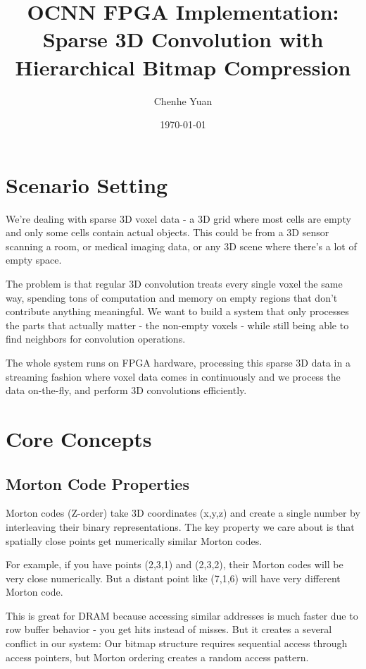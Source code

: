 \documentclass[12pt]{article}
\title{OCNN FPGA Implementation: Sparse 3D Convolution with Hierarchical Bitmap Compression}
\author{Chenhe Yuan}
\date{\today}
\begin{document}
\maketitle

\section{Scenario Setting}

We're dealing with sparse 3D voxel data - a 3D grid where most cells are empty and only some cells contain actual objects. This could be from a 3D sensor scanning a room, or medical imaging data, or any 3D scene where there's a lot of empty space.

The problem is that regular 3D convolution treats every single voxel the same way, spending tons of computation and memory on empty regions that don't contribute anything meaningful. We want to build a system that only processes the parts that actually matter - the non-empty voxels - while still being able to find neighbors for convolution operations.

The whole system runs on FPGA hardware, processing this sparse 3D data in a streaming fashion where voxel data comes in continuously and we process the data on-the-fly, and perform 3D convolutions efficiently.

\section{Core Concepts}

\subsection{Morton Code Properties}
Morton codes (Z-order) take 3D coordinates (x,y,z) and create a single number by interleaving their binary representations. The key property we care about is that spatially close points get numerically similar Morton codes.

For example, if you have points (2,3,1) and (2,3,2), their Morton codes will be very close numerically. But a distant point like (7,1,6) will have very different Morton code.

This is great for DRAM because accessing similar addresses is much faster due to row buffer behavior - you get hits instead of misses. But it creates a several conflict in our system: Our bitmap structure requires sequential access through access pointers, but Morton ordering creates a random access pattern.
\end{document}
